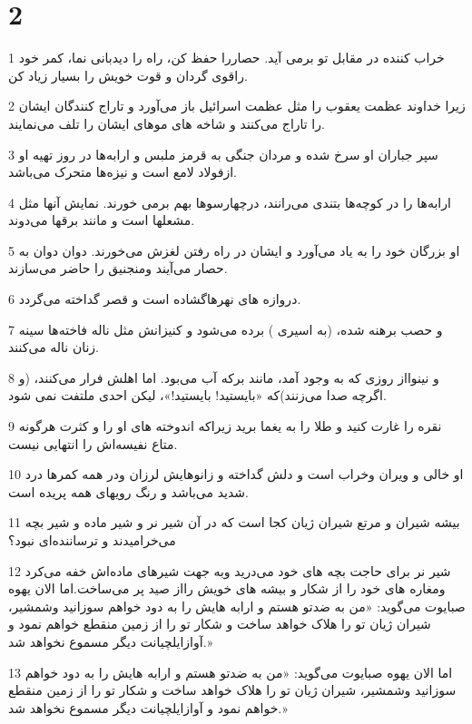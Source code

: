 \chapter{2}

\par 1 خراب کننده در مقابل تو برمی آید. حصاررا حفظ کن، راه را دیدبانی نما، کمر خود راقوی گردان و قوت خویش را بسیار زیاد کن.
\par 2 زیرا خداوند عظمت یعقوب را مثل عظمت اسرائیل باز می‌آورد و تاراج کنندگان ایشان را تاراج می‌کنند و شاخه های موهای ایشان را تلف می‌نمایند.
\par 3 سپر جباران او سرخ شده و مردان جنگی به قرمز ملبس و ارابه‌ها در روز تهیه او ازفولاد لامع است و نیزه‌ها متحرک می‌باشد.
\par 4 ارابه‌ها را در کوچه‌ها بتندی می‌رانند، درچهارسوها بهم برمی خورند. نمایش آنها مثل مشعلها است و مانند برقها می‌دوند.
\par 5 او بزرگان خود را به یاد می‌آورد و ایشان در راه رفتن لغزش می‌خورند. دوان دوان به حصار می‌آیند ومنجنیق را حاضر می‌سازند.
\par 6 دروازه های نهرهاگشاده است و قصر گداخته می‌گردد.
\par 7 و حصب برهنه شده، (به اسیری ) برده می‌شود و کنیزانش مثل ناله فاخته‌ها سینه زنان ناله می‌کنند.
\par 8 و نینوااز روزی که به وجود آمد، مانند برکه آب می‌بود. اما اهلش فرار می‌کنند، (و اگر‌چه صدا می‌زنند)که «بایستید! بایستید!»، لیکن احدی ملتفت نمی شود.
\par 9 نقره را غارت کنید و طلا را به یغما برید زیراکه اندوخته های او را و کثرت هرگونه متاع نفیسه‌اش را انتهایی نیست.
\par 10 او خالی و ویران وخراب است و دلش گداخته و زانوهایش لرزان ودر همه کمرها درد شدید می‌باشد و رنگ رویهای همه پریده است.
\par 11 بیشه شیران و مرتع شیران ژیان کجا است که در آن شیر نر و شیر ماده و شیر بچه می‌خرامیدند و ترساننده‌ای نبود؟
\par 12 شیر نر برای حاجت بچه های خود می‌درید وبه جهت شیرهای ماده‌اش خفه می‌کرد ومغاره های خود را از شکار و بیشه های خویش رااز صید پر می‌ساخت.اما الان یهوه صبایوت می‌گوید: «من به ضدتو هستم و ارابه هایش را به دود خواهم سوزانید وشمشیر، شیران ژیان تو را هلاک خواهد ساخت و شکار تو را از زمین منقطع خواهم نمود و آوازایلچیانت دیگر مسموع نخواهد شد.»
\par 13 اما الان یهوه صبایوت می‌گوید: «من به ضدتو هستم و ارابه هایش را به دود خواهم سوزانید وشمشیر، شیران ژیان تو را هلاک خواهد ساخت و شکار تو را از زمین منقطع خواهم نمود و آوازایلچیانت دیگر مسموع نخواهد شد.»


